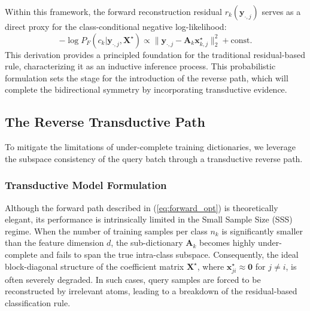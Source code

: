 \documentclass[10pt,comsoc]{IEEEtran}
\begin{document}
Within this framework, the forward reconstruction residual $r_k(\mathbf{y}_{\cdot,j})$ serves as a direct proxy for the class-conditional negative log-likelihood:
\begin{equation}
-\log P_F(c_k | \mathbf{y}_{\cdot,j}, \mathbf{X}^\star) \propto \|\mathbf{y}_{\cdot,j} - \mathbf{A}_k \mathbf{x}_{k,j}^\star\|_2^2 + \text{const}.
\end{equation}
This derivation provides a principled foundation for the traditional residual-based rule, characterizing it as an inductive inference process. This probabilistic formulation sets the stage for the introduction of the reverse path, which will complete the bidirectional symmetry by incorporating transductive evidence.

\subsection{The Reverse Transductive Path}
To mitigate the limitations of under-complete training dictionaries, we leverage the subspace consistency of the query batch through a transductive reverse path.

\subsubsection{Transductive Model Formulation}
Although the forward path described in (\ref{eq:forward_opt}) is theoretically elegant, its performance is intrinsically limited in the Small Sample Size (SSS) regime. When the number of training samples per class $n_k$ is significantly smaller than the feature dimension $d$, the sub-dictionary $\mathbf{A}_k$ becomes highly under-complete and fails to span the true intra-class subspace. Consequently, the ideal block-diagonal structure of the coefficient matrix $\mathbf{X}^\star$, where $\mathbf{x}_{ji}^\star \approx \mathbf{0}$ for $j \neq i$, is often severely degraded. In such cases, query samples are forced to be reconstructed by irrelevant atoms, leading to a breakdown of the residual-based classification rule.
\end{document}
